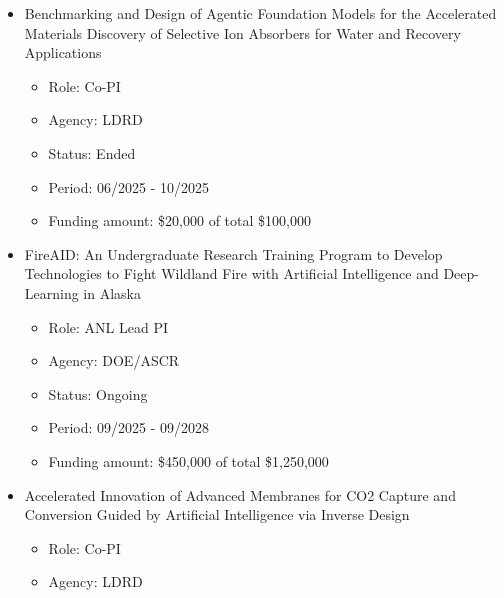 \begin{itemize}

    \item Benchmarking and Design of Agentic Foundation Models for the Accelerated Materials Discovery of Selective Ion Absorbers for Water and Recovery Applications
    \begin{itemize}
        \item Role: Co-PI
        \item Agency: LDRD
        \item Status: Ended
        \item Period: 06/2025 - 10/2025
        \item Funding amount: \$20,000 of total \$100,000
        \end{itemize}
\item FireAID: An Undergraduate Research Training Program to Develop Technologies to Fight Wildland Fire with Artificial Intelligence and Deep-Learning in Alaska
    \begin{itemize}
        \item Role: ANL Lead PI
        \item Agency: DOE/ASCR
        \item Status: Ongoing
        \item Period: 09/2025 - 09/2028
        \item Funding amount: \$450,000 of total \$1,250,000
        \end{itemize}
    \item Accelerated Innovation of Advanced Membranes for CO2 Capture and Conversion Guided by Artificial Intelligence via Inverse Design
    \begin{itemize}
        \item Role: Co-PI
        \item Agency: LDRD

\end{itemize}
\end{itemize}
